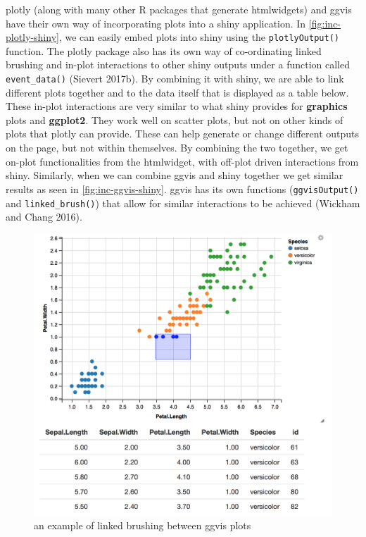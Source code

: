 \documentclass[11pt,]{report}
\begin{document}
\textsf{plotly} (along with many other R packages that generate
htmlwidgets) and ggvis have their own way of incorporating plots into a
shiny application. In \autoref{fig:inc-plotly-shiny}, we can easily
embed plots into \textsf{shiny} using the \texttt{plotlyOutput()}
function. The \textsf{plotly} package also has its own way of
co-ordinating linked brushing and in-plot interactions to other shiny
outputs under a function called \texttt{event\_data()} (Sievert 2017b).
By combining it with \textsf{shiny}, we are able to link different plots
together and to the data itself that is displayed as a table below.
These in-plot interactions are very similar to what \textsf{shiny}
provides for \textbf{graphics} plots and \textbf{ggplot2}. They work
well on scatter plots, but not on other kinds of plots that plotly can
provide. These can help generate or change different outputs on the
page, but not within themselves. By combining the two together, we get
on-plot functionalities from the htmlwidget, with off-plot driven
interactions from shiny. Similarly, when we can combine \textsf{ggvis}
and \textsf{shiny} together we get similar results as seen in
\autoref{fig:inc-ggvis-shiny}. ggvis has its own functions
(\texttt{ggvisOutput()} and \texttt{linked\_brush()}) that allow for
similar interactions to be achieved (Wickham and Chang 2016).

\begin{figure}[H]

{\centering \includegraphics[width=0.7\linewidth,]{./fig/inc-ggvis-shiny} 

}

\caption{\label{fig:inc-ggvis-shiny} an example of linked brushing between ggvis plots}\label{fig:unnamed-chunk-26}
\end{figure}
\end{document}

